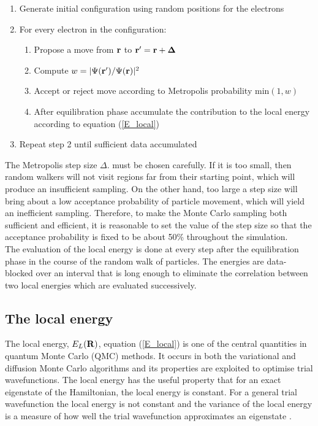\documentclass{article}
\begin{document}
  \begin{enumerate}
    \item Generate initial configuration using random positions for the electrons
    \item For every electron in the configuration:
    \begin{enumerate}
     \item Propose a move from ${\bf r}$ to  ${\bf r}^\prime=\bf r +\Delta$ 
     \item Compute  $w=\vert\Psi({\bf r}^\prime)/\Psi({\bf r})\vert^2$
     \item Accept or reject move according to Metropolis probability $\mathrm{min}(1,w)$
     \item After equilibration phase accumulate the contribution to the local energy according to equation (\ref{E_local})
    \end{enumerate}
    \item Repeat step 2 until sufficient data accumulated 
  \end{enumerate}

The Metropolis step size $\Delta$. must be chosen carefully. If it is too small, then random walkers will not visit regions far from their starting point, which will produce an insufficient sampling. On the other hand, too large a step size will bring about a low acceptance probability of particle movement, which will yield an inefficient sampling. Therefore, to make the Monte Carlo sampling both sufficient and efficient, it is reasonable to set the value of the step size so that the acceptance probability is fixed to be about 50\% throughout the simulation.\\

The evaluation of the local energy is done at every step after the equilibration phase in the course of the random walk of particles. The energies are data-blocked over an interval that is long enough to eliminate the correlation between two local energies which are evaluated successively.


\subsection{The local energy}

The local energy,  $E_{L}({\bf R})$, equation (\ref{E_local}) is one of the central quantities in quantum Monte Carlo (QMC) methods. It occurs in both the variational and diffusion Monte Carlo algorithms and its properties are exploited to optimise trial wavefunctions. The local energy has the useful property that for an exact eigenstate of the Hamiltonian, the local energy is constant. For a general trial wavefunction the local energy is not constant and the variance of the local energy is a measure of how well the trial wavefunction approximates an eigenstate \citep{phd}. \\
\end{document}
